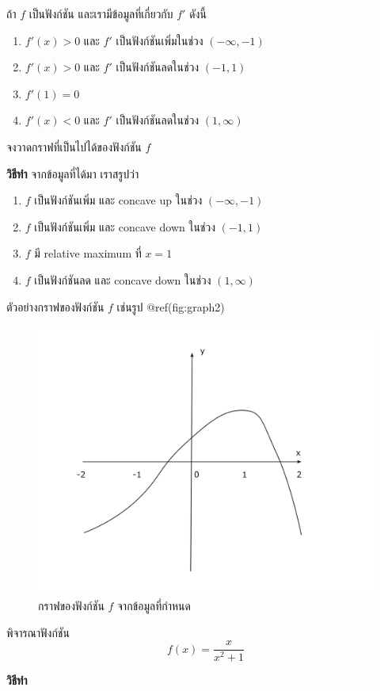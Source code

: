 \documentclass[
]{book}
\begin{document}
ถ้า \(f\) เป็นฟังก์ชัน และเรามีข้อมูลที่เกี่ยวกับ \(f'\) ดังนี้

\begin{enumerate}
\def\labelenumi{\arabic{enumi}.}
\item
  \(f'(x) > 0\) และ \(f'\) เป็นฟังก์ชันเพิ่มในช่วง \((-\infty, -1)\)
\item
  \(f'(x) > 0\) และ \(f'\) เป็นฟังก์ชันลดในช่วง \((-1,1)\)
\item
  \(f'(1) = 0\)
\item
  \(f'(x) < 0\) และ \(f'\) เป็นฟังก์ชันลดในช่วง \((1,\infty)\)
\end{enumerate}

จงวาดกราฟที่เป็นไปได้ของฟังก์ชัน \(f\)

\textbf{วิธีทำ} จากข้อมูลที่ได้มา เราสรูปว่า

\begin{enumerate}
\def\labelenumi{\arabic{enumi}.}
\item
  \(f\) เป็นฟังก์ชันเพิ่ม และ concave up ในช่วง \((-\infty,-1)\)
\item
  \(f\) เป็นฟังก์ชันเพิ่ม และ concave down ในช่วง \((-1,1)\)
\item
  \(f\) มี relative maximum ที่ \(x=1\)
\item
  \(f\) เป็นฟังก์ชันลด และ concave down ในช่วง \((1,\infty)\)
\end{enumerate}

ตัวอย่างกราฟของฟังก์ชัน \(f\) เช่นรูป @ref(fig:graph2)

\begin{figure}

{\centering \includegraphics[width=0.5\linewidth]{images/graph2} 

}

\caption{กราฟของฟังก์ชัน $f$ จากข้อมูลที่กำหนด}\label{fig:graph2}
\end{figure}

พิจารณาฟังก์ชัน \[f(x) = \frac{x}{x^2+1}\]

\textbf{วิธีทำ}
\end{document}
